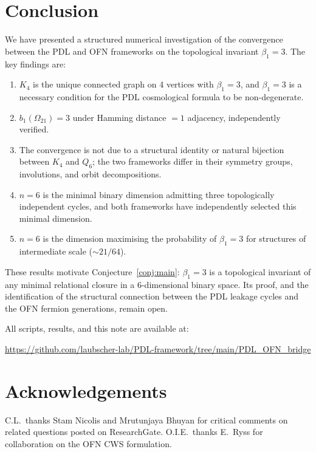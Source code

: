 \documentclass[11pt,a4paper]{article}
\begin{document}
\section{Conclusion}

We have presented a structured numerical investigation of the convergence between the PDL and OFN frameworks on the topological invariant $\beta_1 = 3$. The key findings are:

\begin{enumerate}
\item $K_4$ is the unique connected graph on 4 vertices with $\beta_1 = 3$, and $\beta_1 = 3$ is a necessary condition for the PDL cosmological formula to be non-degenerate.
\item $b_1(\Omega_{21}) = 3$ under Hamming distance $= 1$ adjacency, independently verified.
\item The convergence is not due to a structural identity or natural bijection between $K_4$ and $Q_6$; the two frameworks differ in their symmetry groups, involutions, and orbit decompositions.
\item $n = 6$ is the minimal binary dimension admitting three topologically independent cycles, and both frameworks have independently selected this minimal dimension.
\item $n = 6$ is the dimension maximising the probability of $\beta_1 = 3$ for structures of intermediate scale ($\sim 21/64$).

\end{enumerate}

These results motivate Conjecture~\ref{conj:main}: $\beta_1 = 3$ is a topological invariant of any minimal relational closure in a 6-dimensional binary space. Its proof, and the identification of the structural connection between the PDL leakage cycles and the OFN fermion generations, remain open.

All scripts, results, and this note are available at:
\begin{center}
\url{https://github.com/laubscher-lab/PDL-framework/tree/main/PDL_OFN_bridge}
\end{center}

\section*{Acknowledgements}

C.L.\ thanks Stam Nicolis and Mrutunjaya Bhuyan for critical comments on related questions posted on ResearchGate. O.I.E.\ thanks E.\ Ryss for collaboration on the OFN CWS formulation.



\end{document}
